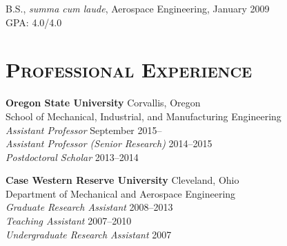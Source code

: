 \documentclass[margin,line,11pt]{res}
\newenvironment{list1}{
  \begin{list}{\ding{113}}{%
      \setlength{\itemsep}{0in}
      \setlength{\parsep}{0in} \setlength{\parskip}{0in}
      \setlength{\topsep}{0in} \setlength{\partopsep}{0in}
      \setlength{\leftmargin}{0.17in}}}{\end{list}}
\begin{document}
\begin{resume}
\begin{list1}
\item[] B.S., \emph{summa cum laude}, Aerospace Engineering,  January 2009 \\
GPA: 4.0\slash 4.0
\end{list1}

\section{\textsc{Professional Experience}}

\textbf{Oregon State University} \hfill Corvallis, Oregon \\
School of Mechanical, Industrial, and Manufacturing Engineering \\
\emph{Assistant Professor} \hfill September 2015-- \\
\emph{Assistant Professor (Senior Research)} \hfill 2014--2015 \\
\emph{Postdoctoral Scholar} \hfill 2013--2014

\textbf{Case Western Reserve University} \hfill Cleveland, Ohio \\
Department of Mechanical and Aerospace Engineering \\
\emph{Graduate Research Assistant} \hfill 2008--2013 \\
\emph{Teaching Assistant} \hfill 2007--2010 \\
\emph{Undergraduate Research Assistant} \hfill 2007


\end{resume}
\end{document}

